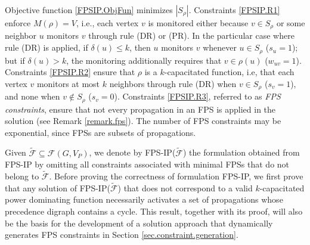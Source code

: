 \documentclass{article}
\newcommand{\FF}{{\mathcal F}}
\newcommand{\FPSIP}{FPS-IP\xspace}
\newcommand{\FPSIPF}[1]{FPS-IP(#1)}
\begin{document}
Objective function \eqref{FPSIP.ObjFun} minimizes $|S_{\rho}|$. 
Constraints \eqref{FPSIP.R1} enforce $M(\rho) = V$, i.e., each vertex $v$ is monitored either because $v \in S_{\rho}$ or some neighbor $u$ monitors $v$ through rule (DR) or (PR).
In the particular case where rule (DR) is applied, if $\delta(u) \leq k$, then $u$ monitors $v$ whenever $u \in S_{\rho}$ ($s_u = 1$); but if $\delta(u) > k$, the monitoring additionally requires that $v \in \rho(u)$ ($w_{uv} = 1$).
Constraints \eqref{FPSIP.R2} ensure that $\rho$ is a $k$-capacitated function, i.e, that each vertex $v$ monitors at most $k$ neighbors through rule (DR) when $v \in S_{\rho}$ ($s_v = 1$), and none when $v \notin S_{\rho}$ ($s_v = 0$).
Constraints \eqref{FPSIP.R3}, referred to as \emph{FPS constraints}, ensure that not every propagation in an FPS is applied in the solution (see Remark \ref{remark.fps}).
The number of FPS constraints may be exponential, since FPSs are subsets of propagations.

Given $\tilde \FF \subseteq \FF(G,V_P)$, we denote by \FPSIPF{$\tilde \FF$} the formulation obtained from \FPSIP by omitting all constraints associated with minimal FPSs that do not belong to $\tilde \FF$. 
Before proving the correctness of formulation \FPSIP, we first prove that any solution of \FPSIPF{$\tilde \FF$} that does not correspond to a valid $k$-capacitated power dominating function necessarily activates a set of propagations whose precedence digraph contains a  cycle.
This result, together with its proof, will also be the basis for the development of a solution approach that dynamically generates FPS constraints in Section \ref{sec.constraint.generation}.
\end{document}
